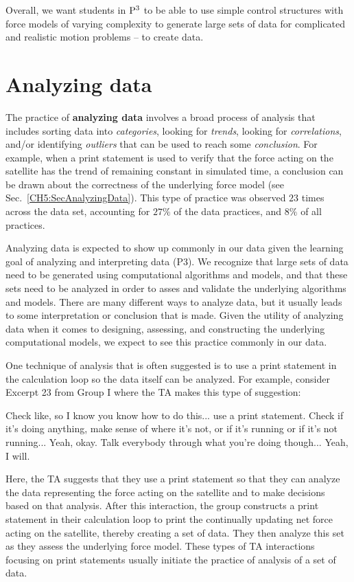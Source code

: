 \documentclass{msuphddissertation}
\begin{document}
\begin{doublespace}
\begin{appendices}
Overall, we want students in ${\rm P}^{3}$ to be able to use simple control structures with force models of varying complexity to generate large sets of data for complicated and realistic motion problems -- to create data.

\section*{Analyzing data}

The practice of \textbf{analyzing data} involves a broad process of analysis that includes sorting data into \textit{categories}, looking for \textit{trends}, looking for \textit{correlations}, and/or identifying \textit{outliers} that can be used to reach some \textit{conclusion}.  For example, when a print statement is used to verify that the force acting on the satellite has the trend of remaining constant in simulated time, a conclusion can be drawn about the correctness of the underlying force model (see Sec.~\ref{CH5:SecAnalyzingData}).  This type of practice was observed $23$ times across the data set, accounting for $27\%$ of the data practices, and $8\%$ of all practices.

Analyzing data is expected to show up commonly in our data given the learning goal of analyzing and interpreting data (P3).  We recognize that large sets of data need to be generated using computational algorithms and models, and that these sets need to be analyzed in order to asses and validate the underlying algorithms and models.  There are many different ways to analyze data, but it usually leads to some interpretation or conclusion that is made.  Given the utility of analyzing data when it comes to designing, assessing, and constructing the underlying computational models, we expect to see this practice commonly in our data.

One technique of analysis that is often suggested is to use a print statement in the calculation loop so the data itself can be analyzed.  For example, consider Excerpt 23 from Group I where the TA makes this type of suggestion: \begin{description}
\TA Check like, so I know you know how to do this... use a print statement.
\TA Check if it's doing anything, make sense of where it's not, or if it's running or if it's not running...
\SB Yeah, okay.
\TA Talk everybody through what you're doing though...
\SB Yeah, I will.\end{description}  Here, the TA suggests that they use a print statement so that they can analyze the data representing the force acting on the satellite and to make decisions based on that analysis.  After this interaction, the group constructs a print statement in their calculation loop to print the continually updating net force acting on the satellite, thereby creating a set of data.  They then analyze this set as they assess the underlying force model.  These types of TA interactions focusing on print statements usually initiate the practice of analysis of a set of data.


\end{appendices}
\end{doublespace}
\end{document}
